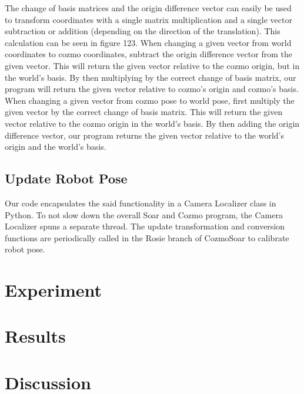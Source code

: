 \documentclass[man]{apa6}
\begin{document}
The change of basis matrices and the origin difference vector can easily be used to transform coordinates with a single matrix multiplication and a single vector subtraction or addition (depending on the direction of the translation). This calculation can be seen in figure 123. When changing a given vector from world coordinates to cozmo coordinates, subtract the origin difference vector from the given vector. This will return the given vector relative to the cozmo origin, but in the world’s basis. By then multiplying by the correct change of basis matrix, our program will return the given vector relative to cozmo’s origin and cozmo’s basis. When changing a given vector from cozmo pose to world pose, first multiply the given vector by the correct change of basis matrix. This will return the given vector relative to the cozmo origin in the world’s basis. By then adding the origin difference vector, our program returns the given vector relative to the world’s origin and the world’s basis.

\subsection{Update Robot Pose}
Our code encapsulates the said functionality in a Camera Localizer class in Python. To not slow down the overall Soar and Cozmo program, the Camera Localizer spuns a separate thread. The update transformation and conversion functions are periodically called in the Rosie branch of CozmoSoar to calibrate robot pose. 

\section{Experiment}


\section{Results}

\section{Discussion}

\printbibliography
\end{document}
